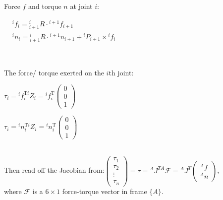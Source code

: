 \begin{minipage}[c]{0.35\textwidth}
Force $f$ and torque $n$ at joint $i$:
\end{minipage}
\hfill
\begin{minipage}[c]{0.6\textwidth}
$\begin{aligned}
	&{ }^{i} f_{i}={ }_{i+1}^{i} R \cdot{ }^{i+1} f_{i+1} \\
	&{ }^{i} n_{i}={ }_{i+1}^{i} R \cdot{ }^{i+1} n_{i+1}+{ }^{i} P_{i+1} \times{ }^{i} f_{i}
	\end{aligned}
$
\end{minipage}\\
\begin{minipage}[c]{0.3\textwidth}
The force/ torque exerted on the $i$th joint:
\end{minipage}
\hfill
\begin{minipage}[c]{0.3\textwidth}
\begin{center}
	$
\tau_{i}={ }^{i} f_{i}^{\mathrm{T} i} Z_{i}={ }^{i} f_{i}^{\mathrm{T}}\left(\begin{array}{l}
0 \\
0 \\
1
\end{array}\right)
$
\end{center}
\end{minipage}
\hfill
\begin{minipage}[c]{0.3\textwidth}
\begin{center}
$
\tau_{i}={ }^{i} n_{i}^{\mathrm{T} i} Z_{i}={ }^{i} n_{i}^{\mathrm{T}}\left(\begin{array}{l}
0 \\
0 \\
1
\end{array}\right)
$
\end{center}
\end{minipage}\\
Then read off the Jacobian from:\quad\quad $\left(\begin{array}{c}
\tau_{1} \\
\tau_{2} \\
\vdots \\
\tau_{n}
\end{array}\right)=\tau={ }^{A} J^{T A} \mathcal{F}={ }^{A} J^{T}\left(\begin{array}{c}
{}^{A}f \\
{}^{A}n
\end{array}\right)
$,\\
where $\mathcal{F}$ is a $6\times 1$ force-torque vector in frame $\{A\}$.

